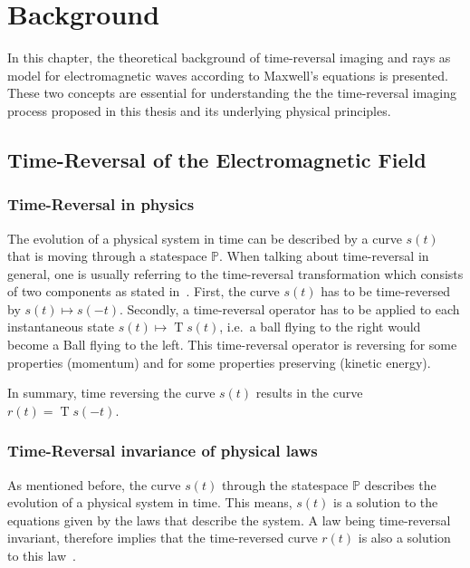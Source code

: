 
\chapter{Background}\label{chapter:background}
In this chapter, the theoretical background of time-reversal imaging and rays as model for electromagnetic waves according to Maxwell's equations is presented.
These two concepts are essential for understanding the the time-reversal imaging process proposed in this thesis and its underlying physical principles. 

\section{Time-Reversal of the Electromagnetic Field}
\subsection{Time-Reversal in physics}
The evolution of a physical system in time can be described by a curve \(s(t)\) that is moving through a statespace \(\mathbb{P}\).
When talking about time-reversal in general, one is usually referring to the time-reversal transformation which consists of two components as stated in~\parencite{roberts_reversing_2022}.
First, the curve \(s(t)\) has to be time-reversed by \(s(t) \mapsto s(-t)\).
Secondly, a time-reversal operator has to be applied to each instantaneous state \(s(t) \mapsto \operatorname{T}s(t)\), i.e.\ a ball flying to the right would become a Ball flying to the left.
This time-reversal operator is reversing for some properties (momentum) and for some properties preserving (kinetic energy).


In summary, time reversing the curve \(s(t)\) results in the curve \(r(t)=\operatorname{T}s(-t)\). 



\subsection{Time-Reversal invariance of physical laws}
As mentioned before, the curve \(s(t)\) through the statespace \(\mathbb{P}\) describes the evolution of a physical system in time.
This means, \(s(t)\) is a solution to the equations given by the laws that describe the system. 
A law being time-reversal invariant, therefore implies that the time-reversed curve \(r(t)\) is also a solution to this law~\parencite{roberts_time_2021}.

